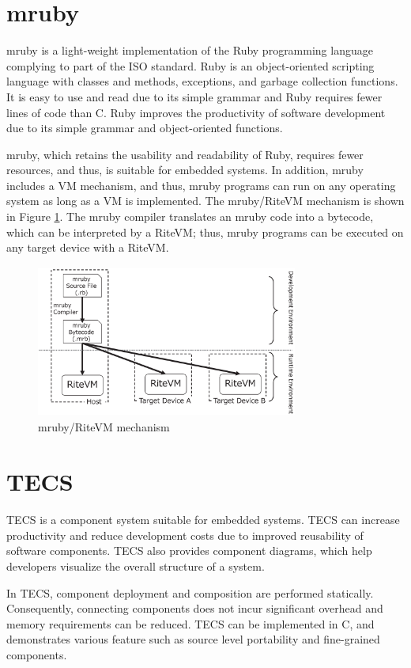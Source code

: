 \documentclass[conference]{IEEEtran/IEEEtran/IEEEtran}
\begin{document}
\clearpage
\appendices
\section{mruby}
mruby is a light-weight implementation of the Ruby programming language complying to part of the ISO standard.
Ruby is an object-oriented scripting language with classes and methods, exceptions, and garbage collection functions.
It is easy to use and read due to its simple grammar and Ruby requires fewer lines of code than C.
Ruby improves the productivity of software development due to its simple grammar and object-oriented functions.

mruby, which retains the usability and readability of Ruby, requires fewer resources, and thus, is suitable for embedded systems.
In addition, mruby includes a VM mechanism, and thus, mruby programs can run on any operating system as long as a VM is implemented.
The mruby/RiteVM mechanism is shown in Figure \ref{fig:mruby}.
The mruby compiler translates an mruby code into a bytecode, which can be interpreted by a RiteVM; thus, mruby programs can be executed on any target device with a RiteVM.
\begin{figure}[h]
    \centering
    \includegraphics[height=5.0cm,width=8.6cm,clip]{figure/mruby.eps}
    \vspace{-2mm}
    \caption{mruby/RiteVM mechanism}
    \vspace{-2mm}
    \label{fig:mruby}
\end{figure}

\section{TECS}
TECS is a component system suitable for embedded systems.
TECS can increase productivity and reduce development costs due to improved reusability of software components.
TECS also provides component diagrams, which help developers visualize the overall structure of a system.

In TECS, component deployment and composition are performed statically.
Consequently, connecting components does not incur significant overhead and memory requirements can be reduced.
TECS can be implemented in C, and demonstrates various feature such as source level portability and fine-grained components.
\end{document}
